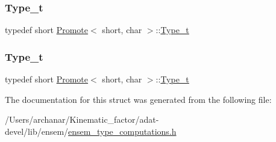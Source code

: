 \subsubsection{\texorpdfstring{Type\_t}{Type\_t}\hspace{0.1cm}{\footnotesize\ttfamily [2/3]}}
{\footnotesize\ttfamily typedef short \mbox{\hyperlink{structPromote}{Promote}}$<$ short, char $>$\+::\mbox{\hyperlink{structPromote_3_01short_00_01char_01_4_ad7373b6a3ec65f1b36fa8c03e0f390f6}{Type\+\_\+t}}}

\mbox{\label{structPromote_3_01short_00_01char_01_4_ad7373b6a3ec65f1b36fa8c03e0f390f6}} 
\subsubsection{\texorpdfstring{Type\_t}{Type\_t}\hspace{0.1cm}{\footnotesize\ttfamily [3/3]}}
{\footnotesize\ttfamily typedef short \mbox{\hyperlink{structPromote}{Promote}}$<$ short, char $>$\+::\mbox{\hyperlink{structPromote_3_01short_00_01char_01_4_ad7373b6a3ec65f1b36fa8c03e0f390f6}{Type\+\_\+t}}}



The documentation for this struct was generated from the following file\+:\begin{DoxyCompactItemize}
\item 
/\+Users/archanar/\+Kinematic\+\_\+factor/adat-\/devel/lib/ensem/\mbox{\hyperlink{adat-devel_2lib_2ensem_2ensem__type__computations_8h}{ensem\+\_\+type\+\_\+computations.\+h}}\end{DoxyCompactItemize}

